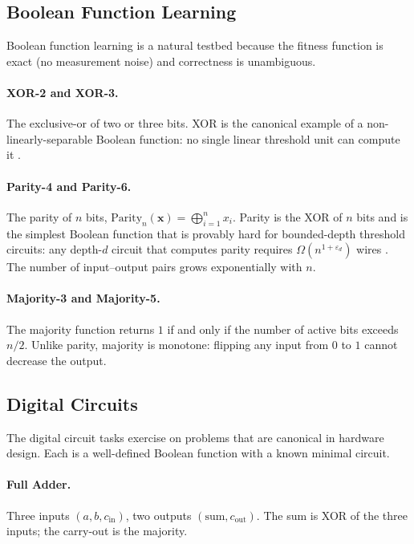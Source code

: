 \subsection{Boolean Function Learning}
\label{sec:exp-boolean}

Boolean function learning is a natural testbed because the fitness
function is exact (no measurement noise) and correctness is unambiguous.

\paragraph{XOR-2 and XOR-3.} The exclusive-or of two or three bits. XOR
is the canonical example of a non-linearly-separable Boolean function:
no single linear threshold unit can compute it
\citep{minsky1969perceptrons}.

\paragraph{Parity-4 and Parity-6.} The parity of $n$ bits,
$\text{Parity}_n(\mathbf{x}) = \bigoplus_{i=1}^{n} x_i$. Parity is the
XOR of $n$ bits and is the simplest Boolean function that is provably
hard for bounded-depth threshold circuits: any depth-$d$ circuit that
computes parity requires $\Omega(n^{1+\varepsilon_d})$ wires
\citep{impagliazzo1997size}. The number of input--output pairs grows
exponentially with $n$.

\paragraph{Majority-3 and Majority-5.} The majority function returns
$1$ if and only if the number of active bits exceeds $n/2$. Unlike
parity, majority is monotone: flipping any input from $0$ to $1$
cannot decrease the output.

\subsection{Digital Circuits}
\label{sec:exp-circuits}

The digital circuit tasks exercise \modnet{} on problems that are
canonical in hardware design. Each is a well-defined Boolean function
with a known minimal circuit.

\paragraph{Full Adder.} Three inputs $(a, b, c_{\text{in}})$, two
outputs $(\text{sum}, c_{\text{out}})$. The sum is XOR of the three
inputs; the carry-out is the majority.

